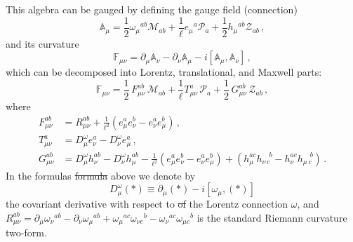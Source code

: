 \documentclass[11pt, a4paper]{article}
\newcommand{\lang}[1]{\textcolor{langfix}{#1}}
\newcommand{\subst}[1]{\textcolor{substantive}{#1}}
\newcommand{\rem}[1]{\textcolor{removeprop}{\sout{#1}}}
\begin{document}
This algebra can be gauged by defining the gauge field (connection)
\begin{equation}\label{2}
\mathbb{A}_{\mu}=\frac{1}{2}\omega_\mu{}^{ab}
\mathcal{M}_{ab}+\frac{1}{\ell}e_\mu{}^{a}
\mathcal{P}_{a}+\frac{1}{2}h_\mu{}^{ab} \mathcal{Z}_{ab}\,,
\end{equation}
and its curvature
\begin{equation}\label{3}
\mathbb{F}_{\mu\nu}=\partial_\mu\mathbb{A}_{\nu}-\partial_\nu\mathbb{A}_{\mu}-i[\mathbb{A}_{\mu},\mathbb{A}_{\nu}]\,,
\end{equation}
which can be decomposed into Lorentz, translational, and Maxwell parts:
\begin{equation}\label{4}
\mathbb{F}_{\mu\nu}=\frac{1}{2}\, F_{\mu\nu}^{ab}\, \mathcal{M}_{ab}
+\frac{1}{\ell}T_{\mu\nu}^{a}\,\mathcal{P}_{a}+ \frac{1}{2}\,
G_{\mu\nu}^{ab}\, \mathcal{Z}_{ab}\,,
\end{equation}
where
\begin{align}
F_{\mu\nu}^{ab}&=R^{ab}_{\mu\nu}+\frac{1}{\ell^2}( e^a_\mu e^b_\nu- e^a_\nu e^b_\mu) \,,\label{5a}\\
T_{\mu\nu}^{a}&=D^\omega_\mu e^a_\nu -D^\omega_\nu e^a_\mu\,,\label{5b}\\
G_{\mu\nu}^{ab}&=D^\omega_\mu h^{ab}_\nu -D^\omega_\nu
h^{ab}_\mu -\frac{1}{\ell^2}( e^a_\mu e^b_\nu- e^a_\nu
e^b_\mu) +(h^{ac}_\mu h^{\quad b}_{\nu\,c}-h^{ac}_\nu h^{\quad
b}_{\mu\,c})\, .\label{5c}
\end{align}
In the \lang{formulas} \rem{formula} above we denote by
\begin{equation}
D^\omega_\mu(\ast)\equiv \partial_\mu(\ast)-i[\omega_\mu,(\ast)]
\end{equation}
the covariant derivative \lang{with respect to} \rem{of} the Lorentz connection $\omega$\subst{, and $R^{ab}_{\mu\nu} = \partial_\mu \omega_\nu{}^{ab} - \partial_\nu \omega_\mu{}^{ab} + \omega_\mu{}^{ac}\omega_{\nu c}{}^b - \omega_\nu{}^{ac}\omega_{\mu c}{}^b$ is the standard Riemann curvature two-form}.
\end{document}
